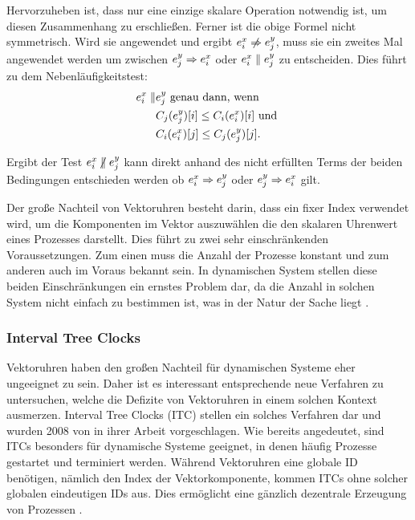 Hervorzuheben ist, dass nur eine einzige skalare Operation notwendig ist, um diesen Zusammenhang zu erschließen.
Ferner ist die obige Formel nicht symmetrisch.
Wird sie angewendet und ergibt $\eix \centernot\Rightarrow \ejy$, muss sie ein zweites Mal angewendet werden um zwischen $e_j^y \Rightarrow e_i^x$ oder $e_i^x \parallel e_j^y$ zu entscheiden.
Dies führt zu dem Nebenläufigkeitstest:
\begin{align*}
    e_i^x \parallel & e_j^y \text{ genau dann, wenn } \\
                   & C_j(e_j^y)[i] \le C_i(e_i^x)[i] \text{ und } \\
                   & C_i(e_i^x)[j] \le C_j(e_j^y)[j].
\end{align*}

Ergibt der Test $\eix \centernot\parallel \ejy$ kann direkt anhand des nicht erfüllten Terms der beiden Bedingungen entschieden werden ob $e_i^x \Rightarrow e_j^y$ oder $e_j^y \Rightarrow e_i^x$ gilt.

Der große Nachteil von Vektoruhren besteht darin, dass ein fixer Index verwendet wird, um die Komponenten im Vektor auszuwählen die den skalaren Uhrenwert eines Prozesses darstellt.
Dies führt zu zwei sehr einschränkenden Voraussetzungen.
Zum einen muss die Anzahl der Prozesse konstant und zum anderen auch im Voraus bekannt sein.
In dynamischen System stellen diese beiden Einschränkungen ein ernstes Problem dar, da die Anzahl in solchen System nicht einfach zu bestimmen ist, was in der Natur der Sache liegt \cite{landes2006dynamic}.

\subsubsection{Interval Tree Clocks}
Vektoruhren haben den großen Nachteil für dynamischen Systeme eher ungeeignet zu sein.
Daher ist es interessant entsprechende neue Verfahren zu untersuchen, welche die Defizite von Vektoruhren in einem solchen Kontext ausmerzen.
Interval Tree Clocks (ITC) stellen ein solches Verfahren dar und wurden 2008 von  in ihrer Arbeit  \cite{almeida2008treeclocks} vorgeschlagen.
Wie bereits angedeutet, sind ITCs besonders für dynamische Systeme geeignet, in denen häufig Prozesse gestartet und terminiert werden.
Während Vektoruhren eine globale ID benötigen, nämlich den Index der Vektorkomponente, kommen ITCs ohne solcher globalen eindeutigen IDs aus. Dies ermöglicht eine gänzlich dezentrale Erzeugung von Prozessen \cite{almeida2008treeclocks}.

